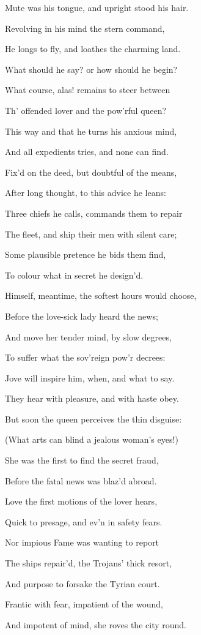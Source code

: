 Mute was his tongue, and upright stood his hair.

Revolving in his mind the stern command,

He longs to fly, and loathes the charming land.

What should he say? or how should he begin?

What course, alas! remains to steer between

Th’ offended lover and the pow’rful queen?

This way and that he turns his anxious mind,

And all expedients tries, and none can find.

Fix’d on the deed, but doubtful of the means,

After long thought, to this advice he leans:

Three chiefs he calls, commands them to repair

The fleet, and ship their men with silent care;

Some plausible pretence he bids them find,

To colour what in secret he design’d.

Himself, meantime, the softest hours would choose,

Before the love-sick lady heard the news;

And move her tender mind, by slow degrees,

To suffer what the sov’reign pow’r decrees:

Jove will inspire him, when, and what to say.

They hear with pleasure, and with haste obey.

But soon the queen perceives the thin disguise:

(What arts can blind a jealous woman’s eyes!)

She was the first to find the secret fraud,

Before the fatal news was blaz’d abroad.

Love the first motions of the lover hears,

Quick to presage, and ev’n in safety fears.

Nor impious Fame was wanting to report

The ships repair’d, the Trojans’ thick resort,

And purpose to forsake the Tyrian court.

Frantic with fear, impatient of the wound,

And impotent of mind, she roves the city round.

